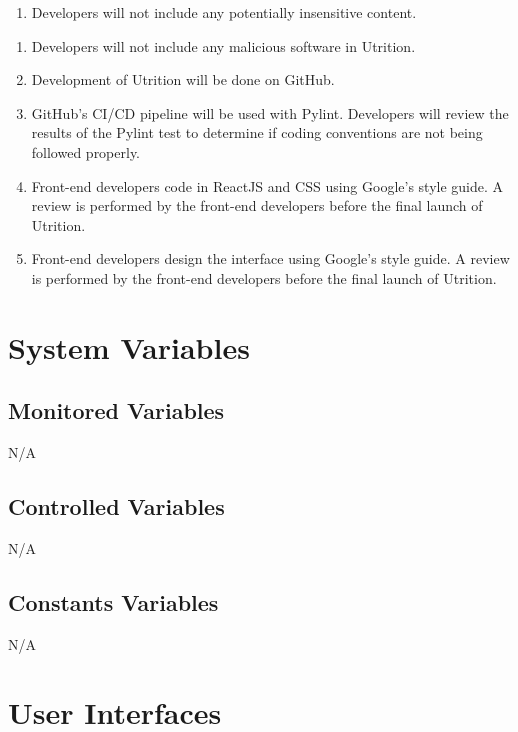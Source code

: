 \documentclass[12pt, titlepage]{article}
\begin{document}
\begin{enumerate}[{CP}1. ]
	\item Developers will not include any potentially insensitive content.
\end{enumerate}	

\begin{enumerate}[{LR}1. ]
	\item Developers will not include any malicious software in Utrition.
	\item Development of Utrition will be done on GitHub.
	\item GitHub’s CI/CD pipeline will be used with Pylint. Developers will review the results of the Pylint test to determine if coding conventions are not being followed properly.
	\item Front-end developers code in ReactJS and CSS using Google’s style guide. A review is performed by the front-end developers before the final launch of Utrition.
	\item Front-end developers design the interface using Google’s style guide. A review is performed by the front-end developers before the final launch of Utrition.
\end{enumerate}	
\section{System Variables}


\subsection{Monitored Variables}

N/A

\subsection{Controlled Variables}

N/A

\subsection{Constants Variables}

N/A

\section{User Interfaces}
\end{document}
